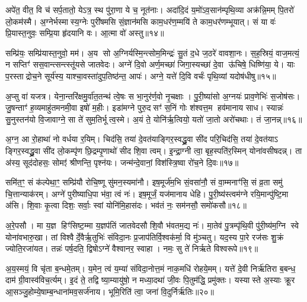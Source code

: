 {\anuvakamend[{आ तवो॒र्जाऽनु॒ षोड॑श च॥३॥}]}

अपे॑त॒ वीत॒ वि च॑ सर्प॒तातो॒ येऽत्र॒ स्थ पु॑रा॒णा ये च॒ नूत॑नाः। अदा॑दि॒दं य॒मो॑ऽव॒सान॑म्पृथि॒व्या अक्र॑न्नि॒मम् पि॒तरो॑ लो॒कम॑स्मै। अ॒ग्नेर्भस्मास्य॒ग्नेः पुरी॑षमसि सं॒ज्ञान॑मसि काम॒धर॑ण॒म्मयि॑ ते काम॒धर॑णम्भूयात्। सं या वः॑ प्रि॒यास्त॒नुवः॒ सम्प्रि॒या हृ॑दयानि वः। आ॒त्मा वो॑ अस्तु॥१४॥

सम्प्रि॑यः॒ सम्प्रि॑यास्त॒नुवो॒ मम॑। अ॒य सो अ॒ग्निर्यस्मि॒न्त्सोम॒मिन्द्रः॑ सु॒तं द॒धे ज॒ठरे॑ वावशा॒नः। स॒ह॒स्रियं॒ वाज॒मत्यं॒ न सप्तिꣳ॑ सस॒वान्त्सन्त्स्तू॑यसे जातवेदः। अग्ने॑ दि॒वो अर्ण॒मच्छा॑ जिगा॒स्यच्छा॑ दे॒वा ऊ॑चिषे॒ धिष्णि॑या॒ ये। याः प॒रस्ताद्रोच॒ने सूर्य॑स्य॒ याश्चा॒वस्ता॑दुप॒तिष्ठ॑न्त॒ आपः॑। अग्ने॒ यत्ते॑ दि॒वि वर्चः॑ पृथि॒व्यां यदोष॑धीषु॥१५॥

अ॒प्सु वा॑ यजत्र। येना॒न्तरि॑क्षमु॒र्वा॑त॒तन्थ॑ त्वे॒षः स भा॒नुर॑र्ण॒वो नृ॒चक्षाः। पु॒री॒ष्या॑सो अ॒ग्नयः॑ प्राव॒णेभिः॑ स॒जोष॑सः। जु॒षन्ताꣳ॑ ह॒व्यमाहु॑तमनमी॒वा इषो॑ म॒हीः। इडा॑मग्ने पुरु॒दसꣳ॑ स॒निं गोः श॑श्वत्त॒म हव॑मानाय साध। स्यान्नः॑ सु॒नुस्तन॑यो वि॒जावाग्ने॒ सा ते॑ सुम॒तिर्भूत्व॒स्मे। अ॒यं ते॒ योनि॑र्\mbox{}ऋ॒त्वियो॒ यतो॑ जा॒तो अरो॑चथाः। तं जा॒नन्न्॥१६॥

अ॒ग्न॒ आ रो॒हाथा॑ नो वर्धया र॒यिम्। चिद॑सि॒ तया॑ दे॒वत॑याङ्गिर॒स्वद्ध्रु॒वा सी॑द परि॒चिद॑सि॒ तया॑ दे॒वत॑याऽ ङ्गिर॒स्वद्ध्रु॒वा सी॑द लो॒कम्पृ॑ण छि॒द्रम्पृ॒णाथो॑ सीद शि॒वा त्वम्। इ॒न्द्रा॒ग्नी त्वा॒ बृह॒स्पति॑र॒स्मिन् योना॑वसीषदन्न्। ता अ॑स्य॒ सूद॑दोहसः॒ सोमꣵ॑ श्रीणन्ति॒ पृश्न॑यः। जन्म॑न्दे॒वानां॒ विश॑स्त्रि॒ष्वा रो॑च॒ने दि॒वः॥१७॥

{\anuvakamend[{अ॒स्त्वोष॑धीषु जा॒नन्न॒ष्टाच॑त्वारिशच्च॥४॥}]}

समि॑त॒ꣳ॒ सं क॑ल्पेथा॒ꣳ॒ सम्प्रि॑यौ रोचि॒ष्णू सु॑मन॒स्यमा॑नौ। इष॒मूर्ज॑म॒भि सं॒वसा॑नौ॒ सं वा॒म्मनाꣳ॑सि॒ सं व्र॒ता समु॑ चि॒त्तान्याक॑रम्। अग्ने॑ पुरीष्याधि॒पा भ॑वा॒ त्वं नः॑। इष॒मूर्जं॒ यज॑मानाय धेहि। पु॒री॒ष्य॑स्त्वम॑ग्ने रयि॒मान्पु॑ष्टि॒मा अ॑सि। शि॒वाः कृ॒त्वा दिशः॒ सर्वाः॒ स्वां योनि॑मि॒हास॑दः। भव॑तं नः॒ सम॑नसौ॒ समो॑कसौ॥१८॥

अ॒रे॒पसौ। मा य॒ज्ञ हिꣳ॑सिष्ट॒म्मा य॒ज्ञप॑तिं जातवेदसौ शि॒वौ भ॑वतम॒द्य नः॑। मा॒तेव॑ पु॒त्रम्पृ॑थि॒वी पु॑री॒ष्य॑म॒ग्नि स्वे योना॑वभारु॒खा। तां विश्वैर्दे॒वैर्\mbox{}ऋ॒तुभिः॑ संविदा॒नः प्र॒जाप॑तिर्वि॒श्वक॑र्मा॒ वि मु॑ञ्चतु। यद॒स्य पा॒रे रज॑सः शु॒क्रं ज्योति॒रजा॑यत। तन्नः॑ पर्\mbox{}ष॒दति॒ द्विषोऽग्ने॑ वैश्वानर॒ स्वाहा। नमः॒ सु ते॑ निर्\mbox{}ऋते विश्वरूपे॥१९॥

अ॒य॒स्मयं॒ वि चृ॑ता ब॒न्धमे॒तम्। य॒मेन॒ त्वं य॒म्या॑ संविदा॒नोत्त॒मं नाक॒मधि॑ रोहये॒मम्। यत्ते॑ दे॒वी निर्\mbox{}ऋ॑तिरा ब॒बन्ध॒ दाम॑ ग्री॒वास्व॑विच॒र्त्यम्। इ॒दं ते॒ तद्वि ष्या॒म्यायु॑षो॒ न मध्या॒दथा॑ जी॒वः पि॒तुम॑द्धि॒ प्रमु॑क्तः। यस्यास्ते अ॒स्याः क्रू॒र आ॒सञ्जु॒होम्ये॒षाम्ब॒न्धाना॑मव॒सर्ज॑नाय। भूमि॒रिति॑ त्वा॒ जना॑ वि॒दुर्निर्\mbox{}ऋ॑तिः॥२०॥

